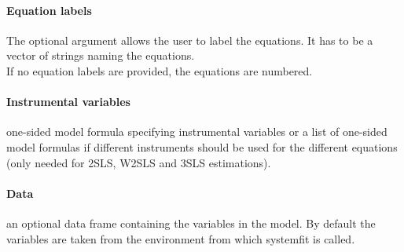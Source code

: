 \paragraph{Equation labels}
The optional argument  allows the user to label the equations.
It has to be a vector of strings naming the equations.\\
If no equation labels are provided, the equations are numbered.
 
\paragraph{Instrumental variables}   
one-sided model formula specifying instrumental variables
   or a list of one-sided model formulas if different instruments should
   be used for the different equations (only needed for 2SLS, W2SLS and
   3SLS estimations).

\paragraph{Data}   
 an optional data frame containing the variables in the model.
   By default the variables are taken from the environment from which
   systemfit is called.

